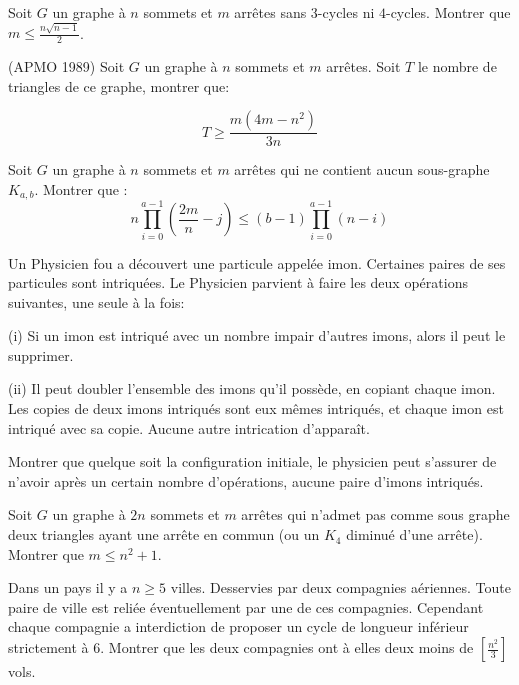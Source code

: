 \begin{exo}
Soit $G$ un graphe à $n$ sommets et $m$ arrêtes sans $3$-cycles ni $4$-cycles. Montrer que $m\leq\frac{n\sqrt{n-1}}{2}$.
\end{exo}

\begin{exo}(APMO 1989) Soit $G$ un graphe à $n$ sommets et $m$ arrêtes. Soit $T$ le nombre de triangles de ce graphe, montrer que:

$$T\geq \frac{m(4m-n^2)}{3n}$$

\end{exo}

\begin{exo}
Soit $G$ un graphe à $n$ sommets et $m$ arrêtes qui ne contient aucun sous-graphe $K_{a,b}$. Montrer que :
$$n\prod_{i=0}^{a-1} (\frac{2m}{n}-j)\leq (b-1)\prod_{i=0}^{a-1} (n-i)$$  
\end{exo}

\begin{exo}
Un Physicien fou a découvert une particule appelée imon. Certaines paires de ses particules sont intriquées. Le Physicien parvient à faire les deux opérations suivantes, une seule à la fois:

(i) Si un imon est intriqué avec un nombre impair d'autres imons, alors il peut le supprimer. 

(ii) Il peut doubler l'ensemble des imons qu'il possède, en copiant chaque imon. Les copies de deux imons intriqués sont eux mêmes intriqués, et chaque imon est intriqué avec sa copie. Aucune autre intrication d'apparaît. 

Montrer que quelque soit la configuration initiale, le physicien peut s'assurer de n'avoir après un certain nombre d'opérations, aucune paire d'imons intriqués. 
\end{exo}

\begin{exo}
Soit $G$ un graphe à $2n$ sommets et $m$ arrêtes qui n'admet pas comme sous graphe deux triangles ayant une arrête en commun (ou un $K_4$ diminué d'une arrête). Montrer que $m\leq n^2+1$.
\end{exo}

\begin{exo}
Dans un pays il y a $n\geq 5$ villes. Desservies par deux compagnies aériennes. Toute paire de ville est reliée éventuellement par une de ces compagnies. Cependant chaque compagnie a interdiction de proposer un cycle de longueur inférieur strictement à $6$. Montrer que les deux compagnies ont à elles deux moins de $\left[\frac{n^2}{3}\right]$ vols.
\end{exo}

